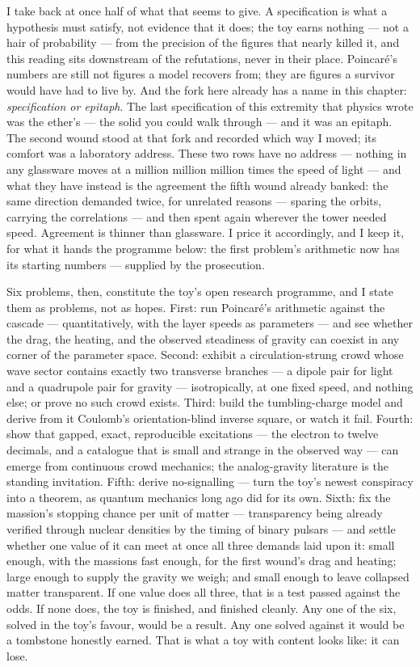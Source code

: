 \documentclass[fontsize=11pt,paper=a4,pagesize=auto,parskip=half-]{scrbook}
\begin{document}
I take back at once half of what that seems to give. A specification is what a hypothesis must satisfy, not evidence that it does; the toy earns nothing --- not a hair of probability --- from the precision of the figures that nearly killed it, and this reading sits downstream of the refutations, never in their place. Poincar\'e's numbers are still not figures a model recovers from; they are figures a survivor would have had to live by. And the fork here already has a name in this chapter: \emph{specification or epitaph}. The last specification of this extremity that physics wrote was the ether's --- the solid you could walk through --- and it was an epitaph. The second wound stood at that fork and recorded which way I moved; its comfort was a laboratory address. These two rows have no address --- nothing in any glassware moves at a million million million times the speed of light --- and what they have instead is the agreement the fifth wound already banked: the same direction demanded twice, for unrelated reasons --- sparing the orbits, carrying the correlations --- and then spent again wherever the tower needed speed. Agreement is thinner than glassware. I price it accordingly, and I keep it, for what it hands the programme below: the first problem's arithmetic now has its starting numbers --- supplied by the prosecution.

Six problems, then, constitute the toy's open research programme, and I state them as problems, not as hopes. First: run Poincar\'e's arithmetic against the cascade --- quantitatively, with the layer speeds as parameters --- and see whether the drag, the heating, and the observed steadiness of gravity can coexist in any corner of the parameter space. Second: exhibit a circulation-strung crowd whose wave sector contains exactly two transverse branches --- a dipole pair for light and a quadrupole pair for gravity --- isotropically, at one fixed speed, and nothing else; or prove no such crowd exists. Third: build the tumbling-charge model and derive from it Coulomb's orientation-blind inverse square, or watch it fail. Fourth: show that gapped, exact, reproducible excitations --- the electron to twelve decimals, and a catalogue that is small and strange in the observed way --- can emerge from continuous crowd mechanics; the analog-gravity literature is the standing invitation. Fifth: derive no-signalling --- turn the toy's newest conspiracy into a theorem, as quantum mechanics long ago did for its own. Sixth: fix the massion's stopping chance per unit of matter --- transparency being already verified through nuclear densities by the timing of binary pulsars --- and settle whether one value of it can meet at once all three demands laid upon it: small enough, with the massions fast enough, for the first wound's drag and heating; large enough to supply the gravity we weigh; and small enough to leave collapsed matter transparent. If one value does all three, that is a test passed against the odds. If none does, the toy is finished, and finished cleanly. Any one of the six, solved in the toy's favour, would be a result. Any one solved against it would be a tombstone honestly earned. That is what a toy with content looks like: it can lose.
\end{document}

